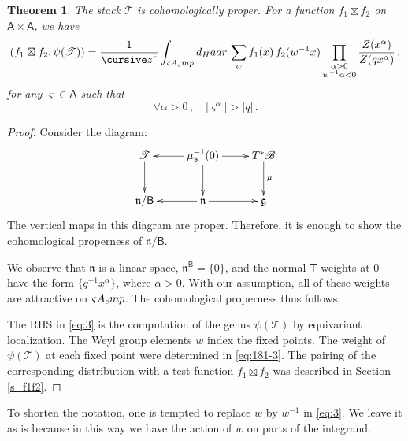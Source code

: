 \documentclass[14pt]{extarticle}
\newcommand{\cz}{\textup{\small \cursive z}}
\newcommand{\bT}{\mathsf{T}}
\newcommand{\bA}{\mathsf{A}}
\newcommand{\bB}{\mathsf{B}}
\newcommand{\cT}{\mathscr{T}}
\newcommand{\cB}{\mathscr{B}}
\newcommand{\fg}{\mathfrak{g}}
\newcommand{\fn}{\mathfrak{n}}
\newcommand{\fb}{\mathfrak{b}}
\newcommand{\comp}{\textup{cmp}}
\newcommand{\Tau}{\mathscr{T}}
\newtheorem{Theorem}{Theorem}
\theoremstyle{definition}
\begin{document}
\subsubsection{}\label{s_t_f1f2}



\begin{Theorem}\label{t_f1f2}
  The stack $\cT$ is cohomologically proper. 
  For a function $f_1 \boxtimes f_2$ on $\bA \times \bA$, we 
  have
  \begin{equation}
  \left(f_1 \boxtimes f_2, \psi(\cT)\right) =
\frac{1}{\cz^r} \int_{\varsigma A_\comp} d_\textup{Haar}
  \, 
   \sum_w f_1(x) \, f_2(w^{-1} x) \prod_{\substack{\alpha > 0 \\ w^{-1} \alpha <0 }}
   \frac{Z(x^\alpha)}{Z(q x^\alpha)} \,,\label{eq:3}
 \end{equation}
   for any  $\varsigma \in \bA$ such that
   \[
     \forall \alpha >0 \,, \quad |\varsigma^\alpha|  > |q|\,. 
  \]
  \end{Theorem}

  \begin{proof}
    Consider the diagram: 
%
  \begin{equation}
    \label{TaunB}
    \xymatrix{ \Tau \ar[d] &\mu_\fb^{-1}(0) \ar[r] \ar[l] \ar[d] & T^*\cB \ar[d]^\mu\\
       \fn/\bB & \fn \ar[r] \ar[l] & \fg 
    }
  \end{equation}
  The vertical maps in this diagram are proper. Therefore, it is enough
  to show the cohomological properness of $\fn/\bB$. 

We observe that $\fn$ is a linear space, $\fn^\bB = \{0\}$, and the normal
$\bT$-weights at $0$ have the form $\{q^{-1} x^\alpha\}$, where
$\alpha >0$. With our assumption,
all of these weights are attractive on $\varsigma
A_\comp$. The cohomological properness thus follows.

The RHS in \eqref{eq:3} is the computation of the genus $\psi(\cT)$ by
equivariant localization. The Weyl group elements $w$ index the fixed
points. The weight of $\psi(\cT)$ at each fixed point were determined
in \eqref{eq:181-3}.  The pairing of the corresponding distribution with a test
function $f_1 \boxtimes f_2$ was described in Section \ref{s_f1f2}. 
\end{proof}

To shorten the notation, one is tempted to  replace $w$ by $w^{-1}$
in \eqref{eq:3}. We leave it as is because in this way we have
the action of $w$ on parts of the integrand.
\end{document}
